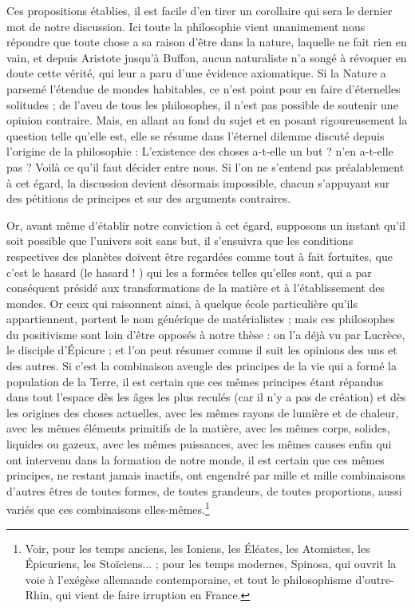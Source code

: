 \documentclass[a4paper, 11pt, oneside]{article}
\begin{document}
Ces propositions établies, il est facile d'en tirer un corollaire qui sera le dernier mot de notre discussion. Ici toute la philosophie vient unanimement nous répondre que toute chose a sa raison d'être dans la nature, laquelle ne fait rien en vain, et depuis Aristote jusqu'à Buffon, aucun naturaliste n'a songé à révoquer en doute cette vérité, qui leur a paru d'une évidence axiomatique. Si la Nature a parsemé l'étendue de mondes habitables, ce n'est point pour en faire d'éternelles solitudes ; de l'aveu de tous les philosophes, il n'est pas possible de soutenir une opinion contraire. Mais, en allant au fond du sujet et en posant rigoureusement la question telle qu'elle est, elle se résume dans l'éternel dilemme discuté depuis l'origine de la philosophie : L'existence des choses a-t-elle un but ? n'en a-t-elle pas ? Voilà ce qu'il faut décider entre nous. Si l'on ne s'entend pas préalablement à cet égard, la discussion devient désormais impossible, chacun s'appuyant sur des pétitions de principes et sur des arguments contraires.

Or, avant même d'établir notre conviction à cet égard, supposons un instant qu'il soit possible que l'univers soit sans but, il s'ensuivra que les conditions respectives des planètes doivent être regardées comme tout à fait fortuites, que c'est le hasard (le hasard ! ) qui les a formées telles qu'elles sont, qui a par conséquent présidé aux transformations de la matière et à l'établissement des mondes. Or ceux qui raisonnent ainsi, à quelque école particulière qu'ils appartiennent, portent le nom générique de matérialistes ; mais ces philosophes du positivisme sont loin d'être opposés à notre thèse : on l'a déjà vu par Lucrèce, le disciple d'Épicure ; et l'on peut résumer comme il suit les opinions des uns et des autres. Si c'est la combinaison aveugle des principes de la vie qui a formé la population de la Terre, il est certain que ces mêmes principes étant répandus dans tout l'espace dès les âges les plus reculés (car il n'y a pas de création) et dès les origines des choses actuelles, avec les mêmes rayons de lumière et de chaleur, avec les mêmes éléments primitifs de la matière, avec les mêmes corps, solides, liquides ou gazeux, avec les mêmes puissances, avec les mêmes causes enfin qui ont intervenu dans la formation de notre monde, il est certain que ces mêmes principes, ne restant jamais inactifs, ont engendré par mille et mille combinaisons d'autres êtres de toutes formes, de toutes grandeurs, de toutes proportions, aussi variés que ces combinaisons elles-mêmes.\footnote{Voir, pour les temps anciens, les Ioniens, les Éléates, les Atomistes, les Épicuriens, les Stoïciens... ; pour les temps modernes, Spinosa, qui ouvrit la voie à l'exégèse allemande contemporaine, et tout le philosophisme d'outre-Rhin, qui vient de faire irruption en France.}
\end{document}
